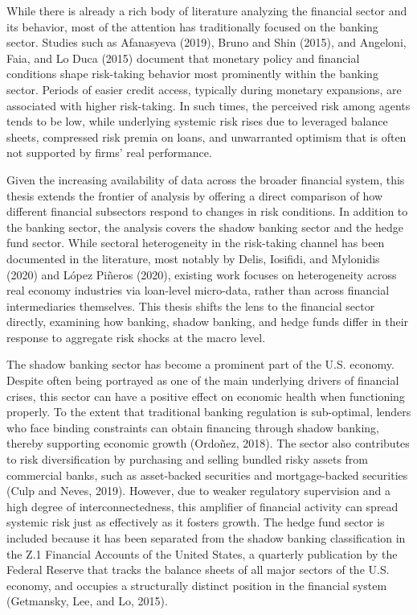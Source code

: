 \documentclass[12pt,a4paper]{report}\usepackage[a4paper, top=2.5cm, bottom=2.5cm, left=2.5cm, right=2.5cm]{geometry}
\begin{document}
While there is already a rich body of literature analyzing the financial sector and its 
behavior, most of the attention has traditionally focused on the banking sector. Studies 
such as Afanasyeva (2019), Bruno and Shin (2015), and Angeloni, Faia, and Lo Duca 
(2015) document that monetary policy and financial conditions shape risk-taking behavior 
most prominently within the banking sector. Periods of easier credit access, typically 
during monetary expansions, are associated with higher risk-taking. In such times, the 
perceived risk among agents tends to be low, while underlying systemic risk rises due to 
leveraged balance sheets, compressed risk premia on loans, and unwarranted optimism 
that is often not supported by firms' real performance.

Given the increasing availability of data across the broader financial system, this thesis extends the frontier of analysis by offering a direct comparison of how different financial subsectors respond to changes in risk conditions. In addition to the banking sector, the analysis covers the shadow banking sector and the hedge fund sector. While sectoral heterogeneity in the risk-taking channel has been documented in the literature, most notably by Delis, Iosifidi, and Mylonidis (2020) and López Piñeros (2020), existing work focuses on heterogeneity across real economy industries via loan-level micro-data, rather than across financial intermediaries themselves. This thesis shifts the lens to the financial sector directly, examining how banking, shadow banking, and hedge funds differ in their response to aggregate risk shocks at the macro level.

The shadow banking sector has become a prominent part of the U.S. economy. Despite often being portrayed as one of the main underlying drivers of financial crises, this sector can have a positive effect on economic health when functioning properly. To the extent that traditional banking regulation is sub-optimal, lenders who face binding constraints can obtain financing through shadow banking, thereby supporting economic growth (Ordoñez, 2018). The sector also contributes to risk diversification by purchasing and selling bundled risky assets from commercial banks, such as asset-backed securities and mortgage-backed securities (Culp and Neves, 2019). However, due to weaker regulatory supervision and a high degree of interconnectedness, this amplifier of financial activity can spread systemic risk just as effectively as it fosters growth. The hedge fund sector is included because it has been separated from the shadow banking classification in the Z.1 Financial Accounts of the United States, a quarterly publication by the Federal Reserve that tracks the balance sheets of all major sectors of the U.S. economy, and occupies a structurally distinct position in the financial system (Getmansky, Lee, and Lo, 2015).  
\end{document}
